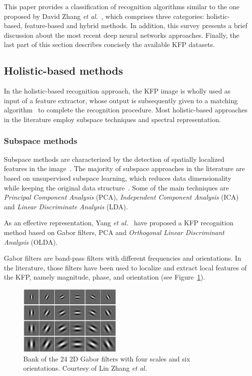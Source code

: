 \documentclass[journal]{IEEEtran}
\begin{document}
This paper provides a classification of recognition algorithms similar to the one proposed by David Zhang \textit{et al.}~\cite{classification}, which comprises three categories: holistic-based, feature-based and hybrid methods.
In addition, this survey presents a brief discussion about the most recent deep neural networks approaches. Finally, the last part of this section describes concisely the available KFP datasets.

\subsection{Holistic-based methods}
In the holistic-based recognition approach, the KFP image is wholly used as input of a feature extractor, whose output is subsequently given to a matching algorithm~\cite{biometricknuckleprint} to complete the recognition procedure. Most holistic-based approaches in the literature employ subspace techniques and spectral representation.

\subsubsection{Subspace methods}
Subspace methods are characterized by the detection of spatially localized features in the image~\cite{KumarKnuckle}. The majority of subspace approaches in the literature are based on unsupervised subspace learning, which reduces data dimensionality while keeping the original data structure~\cite{Jing}. Some of the main techniques are \emph{Principal Component Analysis} (PCA), \emph{Independent Component Analysis} (ICA) and \emph{Linear Discriminate Analysis} (LDA). %

As an effective representation, Yang \textit{et al.}~\cite{WankouYANG:374} have proposed a KFP recognition method based on Gabor filters, PCA and \emph{Orthogonal Linear Discriminant
Analysis} (OLDA).

Gabor filters are band-pass filters with different frequencies and orientations. In the literature, those filters have been used to localize and extract local features of the KFP, namely magnitude, phase, and orientation\cite{ZHANG20111990} (see Figure~\ref{fig:gabor_filter}).

\begin{figure}
    \centering
    \includegraphics[width=2.0in]{images/gabor_filter.png}
    \caption{Bank of the 24 2D Gabor filters with four scales and six orientations. Courtesy of Lin Zhang \textit{et al.}}
    \label{fig:gabor_filter}
\end{figure}
\end{document}
